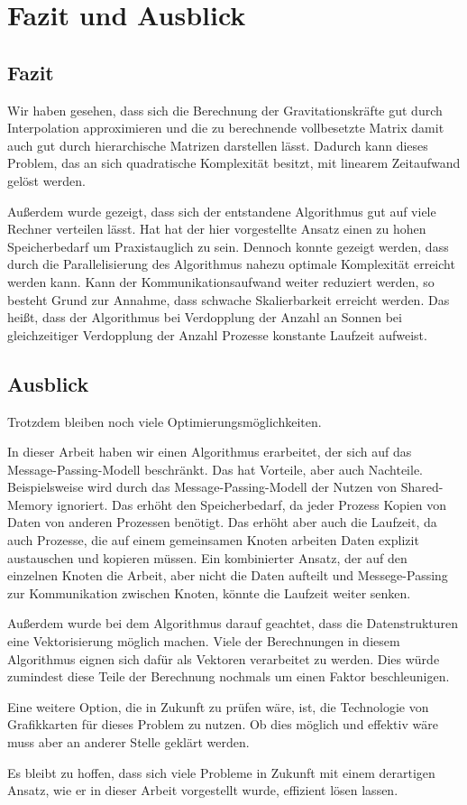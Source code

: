 \chapter{Fazit und Ausblick}
\label{chp:Conclusions}
  \section{Fazit}
    Wir haben gesehen, dass sich die Berechnung der Gravitationskräfte gut durch Interpolation approximieren und die zu berechnende vollbesetzte Matrix damit auch gut durch hierarchische Matrizen
    darstellen lässt. Dadurch kann dieses Problem, das an sich quadratische Komplexität besitzt, mit linearem Zeitaufwand gelöst werden.
    
    Außerdem wurde gezeigt, dass sich der entstandene Algorithmus gut auf viele Rechner verteilen lässt. Hat hat der hier vorgestellte Ansatz einen zu hohen Speicherbedarf um Praxistauglich zu sein. 
    Dennoch konnte gezeigt werden, dass durch die Parallelisierung des Algorithmus nahezu optimale Komplexität erreicht werden kann. Kann der Kommunikationsaufwand weiter reduziert werden, so besteht
    Grund zur Annahme, dass schwache Skalierbarkeit erreicht werden. Das heißt, dass der Algorithmus bei Verdopplung der Anzahl an Sonnen bei gleichzeitiger Verdopplung der Anzahl Prozesse konstante
    Laufzeit aufweist.
    
  \section{Ausblick}
    Trotzdem bleiben noch viele Optimierungsmöglichkeiten. 
    
    In dieser Arbeit haben wir einen Algorithmus erarbeitet, der sich auf das Message-Passing-Modell beschränkt. Das hat Vorteile,
    aber auch Nachteile. Beispielsweise wird durch das Message-Passing-Modell der Nutzen von Shared-Memory ignoriert. Das erhöht den Speicherbedarf, da jeder Prozess Kopien von Daten von anderen
    Prozessen benötigt. Das erhöht aber auch die Laufzeit, da auch Prozesse, die auf einem gemeinsamen Knoten arbeiten Daten explizit austauschen und kopieren müssen. Ein kombinierter Ansatz,
    der auf den einzelnen Knoten die Arbeit, aber nicht die Daten aufteilt und Messege-Passing zur Kommunikation zwischen Knoten, könnte die Laufzeit weiter senken.
    
    Außerdem wurde bei dem Algorithmus darauf geachtet, dass die Datenstrukturen eine Vektorisierung möglich machen. Viele der Berechnungen in diesem Algorithmus eignen sich dafür als Vektoren
    verarbeitet zu werden. Dies würde zumindest diese Teile der Berechnung nochmals um einen Faktor beschleunigen.
    
    Eine weitere Option, die in Zukunft zu prüfen wäre, ist, die Technologie von Grafikkarten für dieses Problem zu nutzen. Ob dies möglich und effektiv wäre muss aber an anderer Stelle geklärt werden.
    
    Es bleibt zu hoffen, dass sich viele Probleme in Zukunft mit einem derartigen Ansatz, wie er in dieser Arbeit vorgestellt wurde, effizient lösen lassen.